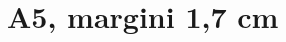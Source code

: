 \documentclass[a5paper,10pt]{article}
\begin{document}
\section*{A5, margini 1,7 cm}
\lipsum[1-5]
\end{document}
